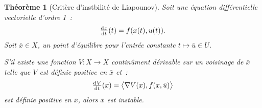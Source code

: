 \documentclass{article}
\newtheorem{thm}{Théorème}[section]
\theoremstyle{definition}
\theoremstyle{remark}
\newcommand{\scpr}[2]{{\left\langle#1, #2\right\rangle}}
\begin{document}
	\newpage

	\begin{thm}[Critère d'instbilité de Liapounov] Soit une équation différentielle vectorielle d'ordre 1~:
	\[\od xt(t) = f(x(t), u(t)).\]
	Soit $\bar x \in X$, un point d'équilibre pour l'entrée constante $t \mapsto \bar u \in U$.

	S'il existe une fonction $V : X \to X$ continûment dérivable sur un voisinage de $\bar x$ telle que $V$ est définie positive en $\bar x$ et~:
	\[\od Vt(x) = \scpr {\nabla V(x)}{f(x, \bar u)}\]
	est définie positive en $\bar x$, alors $\bar x$ est instable.

	\end{thm}
\end{document}
